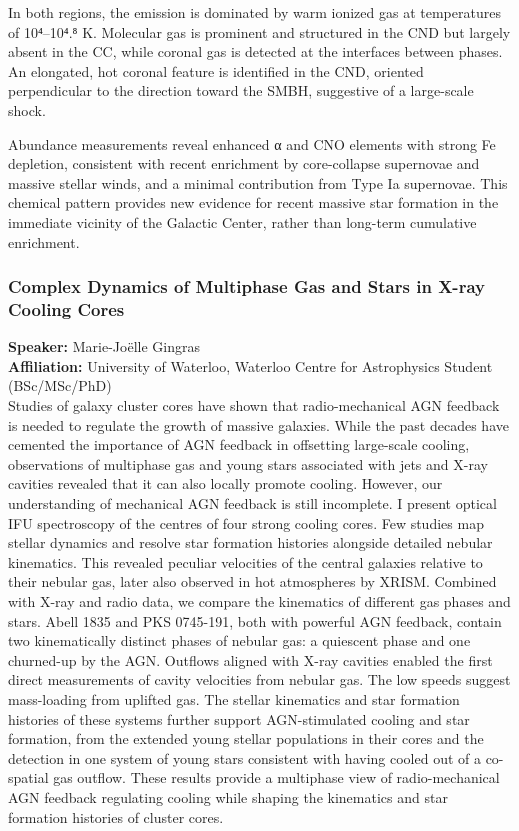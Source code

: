 In both regions, the emission is dominated by warm ionized gas at temperatures of 10⁴–10⁴.⁸ K. Molecular gas is prominent and structured in the CND but largely absent in the CC, while coronal gas is detected at the interfaces between phases. An elongated, hot coronal feature is identified in the CND, oriented perpendicular to the direction toward the SMBH, suggestive of a large-scale shock.

Abundance measurements reveal enhanced α and CNO elements with strong Fe depletion, consistent with recent enrichment by core-collapse supernovae and massive stellar winds, and a minimal contribution from Type Ia supernovae. This chemical pattern provides new evidence for recent massive star formation in the immediate vicinity of the Galactic Center, rather than long-term cumulative enrichment.

\hypertarget{abs-52}{}
\subsubsection*{Complex Dynamics of Multiphase Gas and Stars in X-ray Cooling Cores}
\textbf{Speaker:} Marie-Joëlle Gingras \\
\textbf{Affiliation:} University of Waterloo, Waterloo Centre for Astrophysics \textperiodcentered{} Student (BSc/MSc/PhD)\\
Studies of galaxy cluster cores have shown that radio-mechanical AGN feedback is needed to regulate the growth of massive galaxies. While the past decades have cemented the importance of AGN feedback in offsetting large-scale cooling, observations of multiphase gas and young stars associated with jets and X-ray cavities revealed that it can also locally promote cooling. However, our understanding of mechanical AGN feedback is still incomplete. I present optical IFU spectroscopy of the centres of four strong cooling cores. Few studies map stellar dynamics and resolve star formation histories alongside detailed nebular kinematics. This revealed peculiar velocities of the central galaxies relative to their nebular gas, later also observed in hot atmospheres by XRISM. Combined with X-ray and radio data, we compare the kinematics of different gas phases and stars. Abell 1835 and PKS 0745-191, both with powerful AGN feedback, contain two kinematically distinct phases of nebular gas: a quiescent phase and one churned-up by the AGN. Outflows aligned with X-ray cavities enabled the first direct measurements of cavity velocities from nebular gas. The low speeds suggest mass-loading from uplifted gas. The stellar kinematics and star formation histories of these systems further support AGN-stimulated cooling and star formation, from the extended young stellar populations in their cores and the detection in one system of young stars consistent with having cooled out of a co-spatial gas outflow. These results provide a multiphase view of radio-mechanical AGN feedback regulating cooling while shaping the kinematics and star formation histories of cluster cores.

